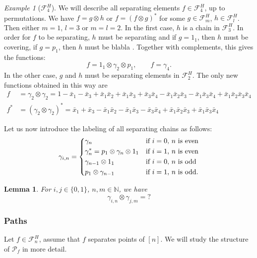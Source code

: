 \documentclass[12pt]{article}
\newtheorem{lemma}{Lemma}
\theoremstyle{definition}
\theoremstyle{remark}
\newtheorem{example}{Example}
\def\blabla{blabla }
\def\Pe{\mathcal P}
\def\Fe{\mathcal F}
\begin{document}
\begin{example}[$\Fe_4^H$]\label{ex:type4} We will describe all separating elements
$f\in \Fe_4^H$, up to permutations. We have  $f=g\otimes h$ or $f=(f\otimes g)^*$  for some $g\in
\Fe_m^H$, $h\in \Fe_l^H$. Then either $m=1$, $l=3$ or $m=l=2$. In the first case, $h$ is a
chain in $\Fe_3^H$. In order for $f$ to be separating, $h$ must be separating and if
$g=1_1$, then $h$ must be covering, if $g=p_1$, then $h$ must be \blabla. Together with
complements, this gives the functions:
\[
f=1_1\otimes \gamma_2\otimes p_1,\qquad f=\gamma_4.
\]
In the other case, $g$ and $h$ must be separating elements in $\Fe_2^H$. The only new
functions obtained in this way are
\begin{align*}
f&= \gamma_2\otimes \gamma_2=1-\bar x_1-\bar x_3+\bar x_1\bar x_2+\bar x_1\bar x_3+\bar x_3\bar x_4- \bar x_1\bar
x_2\bar x_3-\bar x_1\bar x_3\bar x_4+\bar x_1\bar x_2\bar x_3\bar x_4\\
f^*&=  (\gamma_2\otimes \gamma_2)^*=\bar x_1+\bar x_3-\bar x_1\bar x_2-\bar x_1\bar x_3-\bar x_3\bar x_4+ \bar x_1\bar
x_2\bar x_3+\bar x_1\bar x_3\bar x_4
\end{align*}



\end{example}

Let us now introduce the labeling of all separating chains as follows:
\[
\gamma_{i,n}=\begin{dcases} \gamma_n & \text{if $i=0$, $n$ is even}\\
\gamma_n^*=p_1\otimes \gamma_n\otimes 1_1 & \text{if $i=1$, $n$ is even}\\
\gamma_{n-1}\otimes 1_1 & \text{if $i=0$, $n$ is odd}\\
p_1\otimes \gamma_{n-1} & \text{if $i=1$, $n$ is odd}.
\end{dcases}
\]


\begin{lemma}\label{lemma:product_le} For $i,j\in \{0,1\}$, $n,m\in \mathbb N$,  we have 
\[
\gamma_{i,n}\otimes \gamma_{j,m}=?
\]

\end{lemma}






\subsubsection{Paths}

Let $f\in \Fe_n^H$, assume that $f$ separates points of $[n]$. 
We will study the structure of $\Pe_f$ in more detail.
\end{document}
